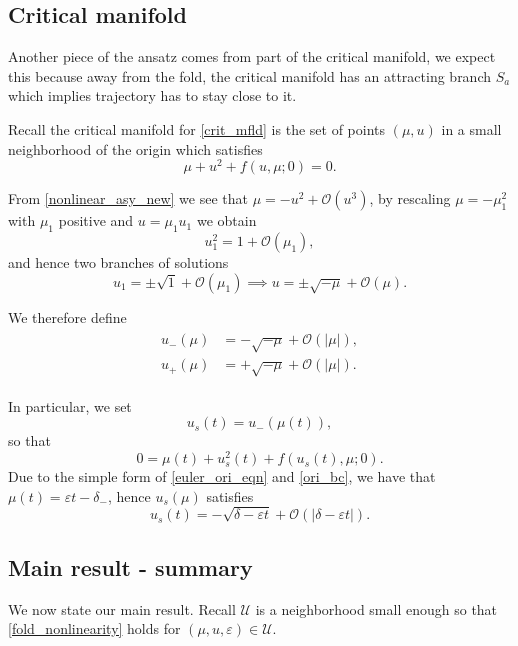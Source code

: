 \documentclass[letterpaper,11pt]{article}
\newcommand{\rmO}{\mathcal{O}}
\newcommand{\eps}{\varepsilon}
\numberwithin{equation}{section}
\theoremstyle{plain}
\begin{document}
\subsection{Critical manifold}\label{c_mfld}
Another piece of the ansatz comes from part of  the critical manifold, we expect this because away from the fold, the critical manifold has an attracting branch $S_a$ which implies trajectory has to stay close to it. 

Recall the critical manifold for \eqref{crit_mfld} is the set of points $(\mu, u) $ in a small neighborhood of the origin which satisfies
\begin{equation} \label{crit_mfld}
\mu + u^2 + f(u,\mu; 0) =  0.
\end{equation}

From \eqref{nonlinear_asy_new} we see that $\mu = -u^2+\rmO(u^3)$, by rescaling $\mu = -\mu_1^2$ with $\mu_1$ positive and $u=\mu_1 u_1$ we obtain
\[
u_1^2 = 1 + \rmO(\mu_1),
\]
and hence two branches of solutions
\[
u_1 = \pm \sqrt{1}+\rmO(\mu_1) \implies u = \pm \sqrt{-\mu}+\rmO(\mu).
\]

We therefore define
\begin{align}
\begin{split}
u_-(\mu) &= -\sqrt{-\mu} + \rmO(|\mu|),\\
u_+(\mu) &= +\sqrt{-\mu} + \rmO(|\mu|).
\end{split}
\end{align}


In particular, we set
\begin{equation}\label{singular}
u_s(t)=u_-(\mu(t)) ,
\end{equation}
so that
\[
0 = \mu(t) + u_s^2(t)+f(u_s(t),\mu; 0).
\]
Due to the simple form of \eqref{euler_ori_eqn} and \eqref{ori_bc}, we have that $\mu(t)= \eps t-\delta_-$, hence $u_s(\mu)$ satisfies
\begin{equation}\label{singularAsy}
u_s(t) = -\sqrt{\delta-\eps t} + \rmO(|\delta-\eps t|).
\end{equation}


\subsection{Main result - summary} \label{main_sum}

We now state our main result. Recall $\mathcal{U}$ is a neighborhood small enough so that \eqref{fold_nonlinearity} holds for $(\mu, u , \eps) \in \mathcal{U}$.
\end{document}
